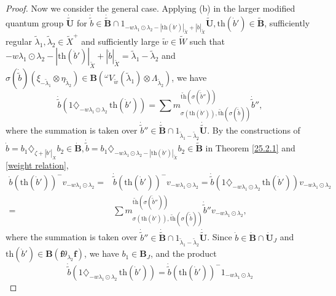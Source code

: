 \documentclass[10pt,a4paper]{amsart}
\begin{document}
\begin{proof}
Now we consider the general case. Applying (b) in the larger modified quantum group $\dot{\tilde{\mathbf{U}}}$ for $\dot{\tilde{b}}\in \dot{\tilde{\mathbf{B}}}\cap 1_{-w\lambda_1\odot\lambda_2-|\mathrm{th}(\dot{b}')|_{\tilde{X}}+|\dot{b}|_{\tilde{X}}}\dot{\tilde{\mathbf{U}}},\mathrm{th}(\dot{b}')\in \tilde{\mathbf{B}}$, sufficiently regular $\tilde{\lambda}_1,\tilde{\lambda}_2\in \tilde{X}^+$ and sufficiently large $\tilde{w}\in \tilde{W}$ such that $-w\lambda_1\odot\lambda_2-|\mathrm{th}(\dot{b}')|_{\tilde{X}}+|\dot{b}|_{\tilde{X}}=\tilde{\lambda}_1-\tilde{\lambda}_2$ and $\sigma(\dot{\tilde{b}})(\xi_{-\tilde{\lambda}_1}\otimes \eta_{\tilde{\lambda}_2})\in \mathbf{B}({^{\omega}V_{\tilde{w}}(\tilde{\lambda}_1)\otimes \Lambda_{\tilde{\lambda}_2}})$, we have  
$$\dot{\tilde{b}}(1\diamondsuit_{-w\lambda_1\odot\lambda_2}\,\mathrm{th}(\dot{b}'))=\sum m_{\sigma(\mathrm{th}(\dot{b}')),\widetilde{\mathrm{th}}(\sigma(\dot{\tilde{b}}))}^{\widetilde{\mathrm{th}}(\sigma(\dot{\tilde{b}}''))}\dot{\tilde{b}}'',$$
where the summation is taken over $\dot{\tilde{b}}''\in \dot{\tilde{\mathbf{B}}}\cap 1_{\tilde{\lambda}_1-\tilde{\lambda}_2}\dot{\tilde{\mathbf{U}}}$.
By the constructions of $\dot{b}=b_1\diamondsuit_{\zeta+|\dot{b}'|_X}b_2\in \dot{\mathbf{B}},\dot{\tilde{b}}=b_1\diamondsuit_{-w\lambda_1\odot\lambda_2-|\mathrm{th}(\dot{b}')|_{\tilde{X}}}b_2\in \dot{\tilde{\mathbf{B}}}$ in Theorem \ref{25.2.1} and \eqref{weight relation},   
\begin{equation}\label{the product acts on Verma}
\begin{aligned}
\dot{b}(\mathrm{th}(\dot{b}'))^-v_{-w\lambda_1\odot\lambda_2}=&\dot{\tilde{b}}(\mathrm{th}(\dot{b}'))^-v_{-w\lambda_1\odot\lambda_2}=\dot{\tilde{b}}(1\diamondsuit_{-w\lambda_1\odot\lambda_2}\,\mathrm{th}(\dot{b}'))v_{-w\lambda_1\odot\lambda_2}\\
=&\sum m_{\sigma(\mathrm{th}(\dot{b}')),\widetilde{\mathrm{th}}(\sigma(\dot{\tilde{b}}))}^{\widetilde{\mathrm{th}}(\sigma(\dot{\tilde{b}}''))}\dot{\tilde{b}}''v_{-w\lambda_1\odot\lambda_2},
\end{aligned}
\end{equation}
where the summation is taken over $\dot{\tilde{b}}''\in \dot{\tilde{\mathbf{B}}}\cap 1_{\tilde{\lambda}_1-\tilde{\lambda}_2}\dot{\tilde{\mathbf{U}}}$. Since $\dot{b}\in \dot{\mathbf{B}}\cap\dot{\mathbf{U}}_J$ and $\mathrm{th}(\dot{b}')\in \mathbf{B}(\mathbf{f}\theta_{\lambda_2}\mathbf{f})$, we have $b_1\in \mathbf{B}_J$, and the product
$$\dot{\tilde{b}}(1\diamondsuit_{-w\lambda_1\odot\lambda_2}\,\mathrm{th}(\dot{b}'))=\dot{\tilde{b}}(\mathrm{th}(\dot{b}'))^-1_{-w\lambda_1\odot\lambda_2}$$

\end{proof}
\end{document}
